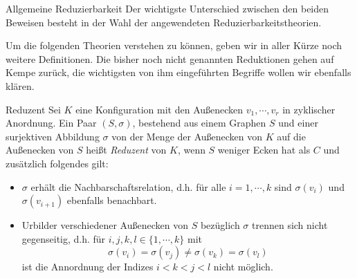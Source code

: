 \begin{section}{Allgemeine Reduzierbarkeit}
 \label{sec:AHRed}
 Der wichtigste Unterschied zwischen den beiden Beweisen besteht in der Wahl der angewendeten Reduzierbarkeitstheorien. 
 
 Um die folgenden Theorien verstehen zu können, geben wir in aller Kürze noch weitere Definitionen. Die bisher noch nicht genannten Reduktionen gehen auf Kempe zurück, die wichtigsten von ihm eingeführten Begriffe wollen wir ebenfalls klären.
 
 \begin{definition}{Reduzent}
  Sei $K$ eine Konfiguration mit den Außenecken $v_1,\cdots,v_r$ in zyklischer Anordnung. Ein Paar $(S,\sigma)$, bestehend aus einem Graphen $S$ und einer surjektiven Abbildung $\sigma$ von der Menge der Außenecken von $K$ auf die Außenecken von $S$ heißt \textit{Reduzent} von $K$, wenn $S$ weniger Ecken hat als $C$ und zusätzlich folgendes gilt:
  \begin{itemize}
   \item $\sigma$ erhält die Nachbarschaftsrelation, d.h. für alle $i = 1,\cdots,k$ sind $\sigma(v_i)$ und $\sigma(v_{i+1})$ ebenfalls benachbart.
   \item Urbilder verschiedener Außenecken von $S$ bezüglich $\sigma$ trennen sich nicht gegenseitig, d.h. für $i,j,k,l \in \{1,\cdots,k\}$ mit
   \[ \sigma(v_i) = \sigma(v_j) \neq \sigma(v_k) = \sigma(v_l)\]
   ist die Annordnung der Indizes $i < k < j < l$ nicht möglich.
  \end{itemize}
 \end{definition}
 

\end{section}
